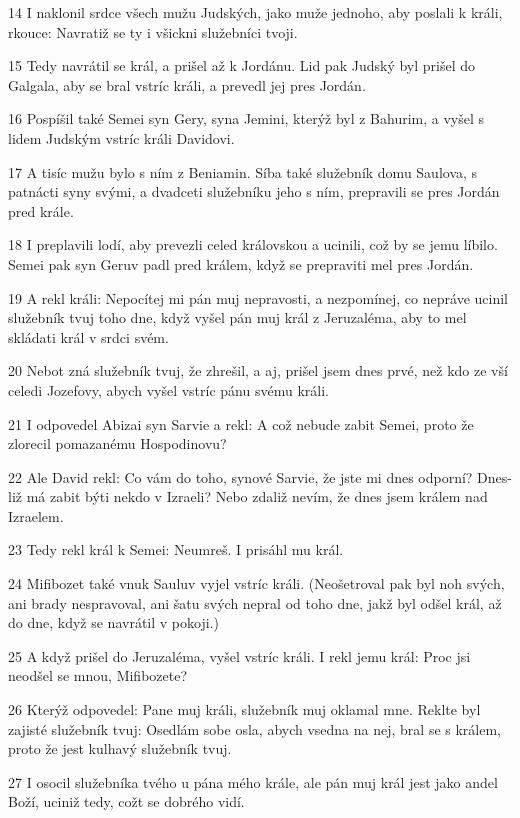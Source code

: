 \par 14 I naklonil srdce všech mužu Judských, jako muže jednoho, aby poslali k králi, rkouce: Navratiž se ty i všickni služebníci tvoji.
\par 15 Tedy navrátil se král, a prišel až k Jordánu. Lid pak Judský byl prišel do Galgala, aby se bral vstríc králi, a prevedl jej pres Jordán.
\par 16 Pospíšil také Semei syn Gery, syna Jemini, kterýž byl z Bahurim, a vyšel s lidem Judským vstríc králi Davidovi.
\par 17 A tisíc mužu bylo s ním z Beniamin. Síba také služebník domu Saulova, s patnácti syny svými, a dvadceti služebníku jeho s ním, prepravili se pres Jordán pred krále.
\par 18 I preplavili lodí, aby prevezli celed královskou a ucinili, což by se jemu líbilo. Semei pak syn Geruv padl pred králem, když se prepraviti mel pres Jordán.
\par 19 A rekl králi: Nepocítej mi pán muj nepravosti, a nezpomínej, co nepráve ucinil služebník tvuj toho dne, když vyšel pán muj král z Jeruzaléma, aby to mel skládati král v srdci svém.
\par 20 Nebot zná služebník tvuj, že zhrešil, a aj, prišel jsem dnes prvé, než kdo ze vší celedi Jozefovy, abych vyšel vstríc pánu svému králi.
\par 21 I odpovedel Abizai syn Sarvie a rekl: A což nebude zabit Semei, proto že zlorecil pomazanému Hospodinovu?
\par 22 Ale David rekl: Co vám do toho, synové Sarvie, že jste mi dnes odporní? Dnes-liž má zabit býti nekdo v Izraeli? Nebo zdaliž nevím, že dnes jsem králem nad Izraelem.
\par 23 Tedy rekl král k Semei: Neumreš. I prisáhl mu král.
\par 24 Mifibozet také vnuk Sauluv vyjel vstríc králi. (Neošetroval pak byl noh svých, ani brady nespravoval, ani šatu svých nepral od toho dne, jakž byl odšel král, až do dne, když se navrátil v pokoji.)
\par 25 A když prišel do Jeruzaléma, vyšel vstríc králi. I rekl jemu král: Proc jsi neodšel se mnou, Mifibozete?
\par 26 Kterýž odpovedel: Pane muj králi, služebník muj oklamal mne. Reklte byl zajisté služebník tvuj: Osedlám sobe osla, abych vsedna na nej, bral se s králem, proto že jest kulhavý služebník tvuj.
\par 27 I osocil služebníka tvého u pána mého krále, ale pán muj král jest jako andel Boží, uciniž tedy, cožt se dobrého vidí.
